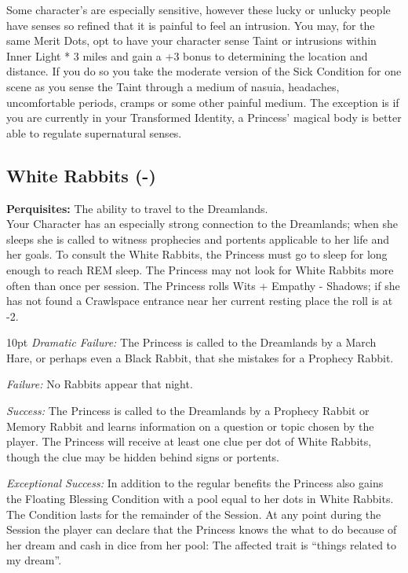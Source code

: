 Some character's are especially sensitive, however these lucky or unlucky people have senses so refined that it is painful to feel an intrusion. You may, for the same Merit Dots, opt to have your character sense Taint or intrusions within Inner Light * 3 miles and gain a +3 bonus to determining the location and distance. If you do so you take the moderate version of the Sick Condition for one scene as you sense the Taint through a medium of nasuia, headaches, uncomfortable periods, cramps or some other painful medium. The exception is if you are currently in your Transformed Identity, a Princess' magical body is better able to regulate supernatural senses.

\subsection*{White Rabbits (\textbullet\nobreak\hspace{.16667em}-\nobreak\hspace{.16667em}\textbullet\textbullet\textbullet\textbullet\textbullet)}

\textbf{Perquisites:} The ability to travel to the Dreamlands.\\

\noindent Your Character has an especially strong connection to the Dreamlands; when she sleeps she is called to witness prophecies and portents applicable to her life and her goals. To consult the White Rabbits, the Princess must go to sleep for long enough to reach REM sleep. The Princess may not look for White Rabbits more often than once per session. The Princess rolls Wits + Empathy - Shadows; if she has not found a Crawlspace entrance near her current resting place the roll is at -2.
\begin{myindentpar}{10pt}
    \emph{Dramatic Failure:} The Princess is called to the Dreamlands by a March Hare, or perhaps even a Black Rabbit, that she mistakes for a Prophecy Rabbit.
    
    \emph{Failure:} No Rabbits appear that night.
    
    \emph{Success:} The Princess is called to the Dreamlands by a Prophecy Rabbit or Memory Rabbit and learns information on a question or topic chosen by the player. The Princess will receive at least one clue per dot of White Rabbits, though the clue may be hidden behind signs or portents.
    
    \emph{Exceptional Success:} In addition to the regular benefits the Princess also gains the Floating Blessing Condition with a pool equal to her dots in White Rabbits. The Condition lasts for the remainder of the Session. At any point during the Session the player can declare that the Princess knows the what to do because of her dream and cash in dice from her pool: The affected trait is \textquotedblleft things related to my dream\textquotedblright. 
\end{myindentpar}

